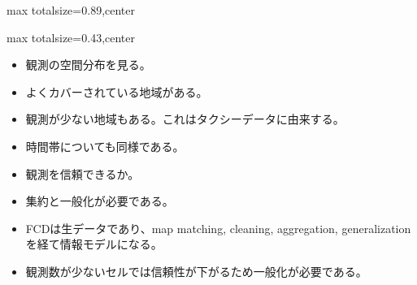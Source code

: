 \begin{minipage}[t]{0.58\textwidth}
\begin{adjustbox}{max totalsize={\textwidth}{0.89\textheight},center}
\begin{minipage}{\textwidth}
\end{minipage}
\end{adjustbox}
\end{minipage}


\clearpage
{}
\begin{minipage}[t]{0.405\textwidth}
\begin{adjustbox}{max totalsize={\textwidth}{0.43\textheight},center}
\begin{minipage}{\textwidth}\scriptsize
{}\begin{itemize}
\item 観測の空間分布を見る。
\item よくカバーされている地域がある。
\item 観測が少ない地域もある。これはタクシーデータに由来する。
\item 時間帯についても同様である。
\item 観測を信頼できるか。
\item 集約と一般化が必要である。
\end{itemize}\begin{itemize}
\item FCDは生データであり、map matching, cleaning, aggregation, generalization を経て情報モデルになる。
\item 観測数が少ないセルでは信頼性が下がるため一般化が必要である。
\end{itemize}
\end{minipage}
\end{adjustbox}
\end{minipage}\hfill
